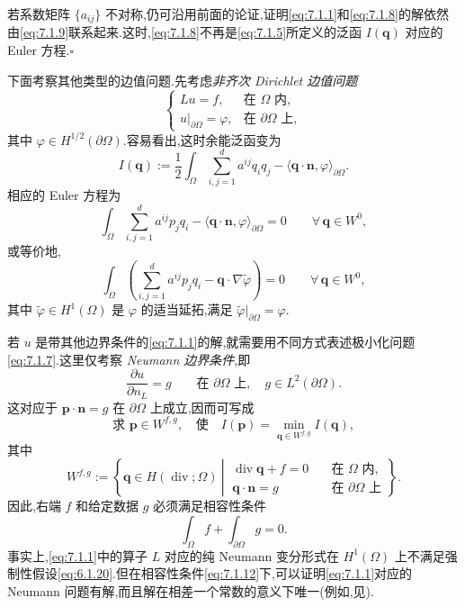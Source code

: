 \begin{note}
若系数矩阵 \(\{a_{ij}\}\) 不对称,仍可沿用前面的论证,证明\eqref{eq:7.1.1}和\eqref{eq:7.1.8}的解依然由\eqref{eq:7.1.9}联系起来.这时,\eqref{eq:7.1.8}不再是\eqref{eq:7.1.5}所定义的泛函 \(I(\boldsymbol{q})\) 对应的 Euler 方程.\hfill\(\square\)
\end{note}

下面考察其他类型的边值问题.先考虑\emph{非齐次 Dirichlet 边值问题}
\[
  \begin{cases}
    Lu=f,&\text{在 }\Omega\text{ 内},\\
    u|_{\partial\Omega}=\varphi,&\text{在 }\partial\Omega\text{ 上},
  \end{cases}
\]
其中 \(\varphi\in H^{1/2}(\partial\Omega)\).容易看出,这时余能泛函变为
\[
  I(\boldsymbol{q}):=\frac12\int_\Omega\sum_{i,j=1}^d a^{ij}q_iq_j
    -\langle\boldsymbol{q}\cdot\boldsymbol{n},\varphi\rangle_{\partial\Omega}.
\]
相应的 Euler 方程为
\[
  \int_\Omega\sum_{i,j=1}^d a^{ij}p_jq_i
    -\langle\boldsymbol{q}\cdot\boldsymbol{n},\varphi\rangle_{\partial\Omega}=0
    \qquad\forall\,\boldsymbol{q}\in W^0,
\]
或等价地,
\[
  \int_\Omega\left(\sum_{i,j=1}^d a^{ij}p_jq_i-\boldsymbol{q}\cdot\nabla\widetilde\varphi\right)=0
    \qquad\forall\,\boldsymbol{q}\in W^0,
\]
其中 \(\widetilde\varphi\in H^1(\Omega)\) 是 \(\varphi\) 的适当延拓,满足 \(\widetilde\varphi|_{\partial\Omega}=\varphi\).

若 \(u\) 是带其他边界条件的\eqref{eq:7.1.1}的解,就需要用不同方式表述极小化问题\eqref{eq:7.1.7}.这里仅考察 \emph{Neumann 边界条件},即
\[
  \frac{\partial u}{\partial n_L}=g\qquad\text{在 }\partial\Omega\text{ 上},
       \quad g\in L^2(\partial\Omega).
\]
这对应于 \(\boldsymbol{p}\cdot\boldsymbol{n}=g\) 在 \(\partial\Omega\) 上成立,因而可写成
\begin{equation}\label{eq:7.1.10}
  \text{求 }\boldsymbol{p}\in W^{f,g},\quad\text{使}\quad
     I(\boldsymbol{p})=\min_{\boldsymbol{q}\in W^{f,g}}I(\boldsymbol{q}),
\end{equation}
其中
\begin{equation}\label{eq:7.1.11}
  W^{f,g}:=\left\{\boldsymbol{q}\in H(\operatorname{div};\Omega)\ \left|\ 
    \begin{aligned}
      \operatorname{div}\boldsymbol{q}+f=0&\quad\text{在 }\Omega\text{ 内},\\
      \boldsymbol{q}\cdot\boldsymbol{n}=g&\quad\text{在 }\partial\Omega\text{ 上}
    \end{aligned}
  \right.\right\}.
\end{equation}
因此,右端 \(f\) 和给定数据 \(g\) 必须满足相容性条件
\begin{equation}\label{eq:7.1.12}
  \int_\Omega f+\int_{\partial\Omega}g=0.
\end{equation}
事实上,\eqref{eq:7.1.1}中的算子 \(L\) 对应的纯 Neumann 变分形式在 \(H^1(\Omega)\) 上不满足强制性假设\eqref{eq:6.1.20}.但在相容性条件\eqref{eq:7.1.12}下,可以证明\eqref{eq:7.1.1}对应的 Neumann 问题有解,而且解在相差一个常数的意义下唯一(例如,见).

